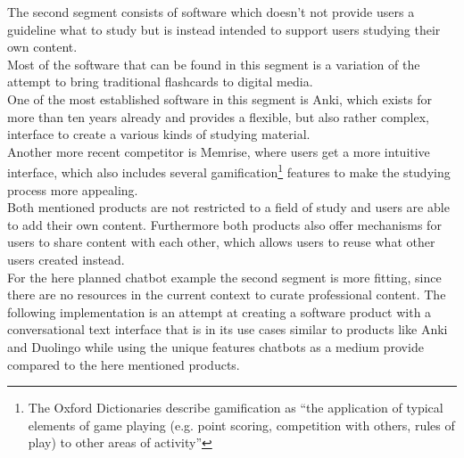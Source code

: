 The second segment consists of software which doesn't not provide users a guideline what to study but is instead intended to support users studying their own content.
\\
Most of the software that can be found in this segment is a variation of the attempt to bring traditional flashcards to digital media.
\\
One of the most established software in this segment is Anki\cite{lifehacker}, which exists for more than ten years already and provides a flexible, but also rather complex, interface to create a various kinds of studying material.
\\
Another more recent competitor is Memrise, where users get a more intuitive interface, which also includes several gamification\footnote{The Oxford Dictionaries describe gamification as ``the application of typical elements of game playing (e.g. point scoring, competition with others, rules of play) to other areas of activity''\cite{oxfordgamification}} features to make the studying process more appealing.
\\
Both mentioned products are not restricted to a field of study and users are able to add their own content. Furthermore both products also offer mechanisms for users to share content with each other, which allows users to reuse what other users created instead.
\\

For the here planned chatbot example the second segment is more fitting, since there are no resources in the current context to curate professional content.
The following implementation is an attempt at creating a software product with a conversational text interface that is in its use cases similar to products like Anki and Duolingo while using the unique features chatbots as a medium provide compared to the here mentioned products.
